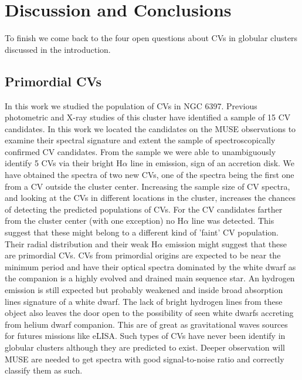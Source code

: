 \chapter{Discussion and Conclusions}\label{chap:conclu}
\thispagestyle{fancy}

To finish we come back to the four open questions about CVs in globular clusters discussed in the introduction. 

\section{Primordial CVs}


In this work we studied the population of CVs in NGC 6397. Previous photometric and X-ray studies of this cluster have identified a sample of 15 CV candidates. In this work we located the candidates on the MUSE observations to examine their spectral signature and extent the sample of spectroscopically confirmed CV candidates. From the sample we were able to unambiguously identify 5 CVs via their bright H$\alpha$ line in emission, sign of an accretion disk. We have obtained the spectra of two new CVs, one of the spectra being the first one from a CV outside the cluster center. Increasing the sample size of CV spectra, and looking at the CVs in different locations in the cluster, increases the chances of detecting the predicted populations of CVs. For the CV candidates farther from the cluster center (with one exception) no H$\alpha$ line was detected. This suggest that these might belong to a different kind of 'faint' CV population. Their radial distribution and their weak H$\alpha$ emission might suggest that these are primordial CVs. CVs from primordial origins are expected to be near the minimum period and have their optical spectra dominated by the white dwarf as the companion is a highly evolved and drained main sequence star. An hydrogen emission is still expected but probably weakened and inside broad absorption lines signature of a white dwarf. The lack of bright hydrogen lines from these object also leaves the door open to the possibility of seen white dwarfs accreting from helium dwarf companion. This are of great as gravitational waves sources for futures missions like eLISA. Such types of CVs have never been identify in globular clusters although they are predicted to exist. Deeper observation will MUSE are needed to get spectra with good signal-to-noise ratio and correctly classify them as such. 

